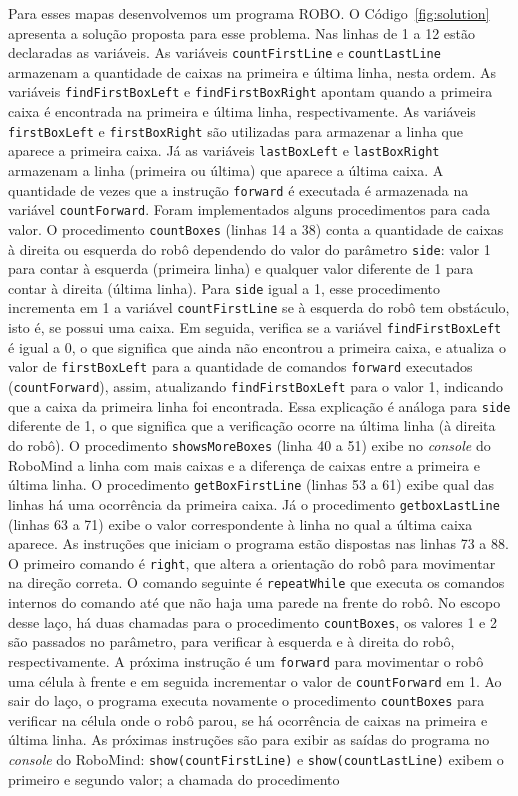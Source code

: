 Para esses mapas desenvolvemos um programa ROBO. O Código~\ref{fig:solution} apresenta a solução proposta para esse problema. Nas linhas de 1 a 12 estão declaradas as variáveis. As variáveis \texttt{countFirstLine} e \texttt{countLastLine} armazenam a quantidade de caixas na primeira e última linha, nesta ordem. As variáveis \texttt{findFirstBoxLeft} e \texttt{findFirstBoxRight} apontam quando a primeira caixa é encontrada na primeira e última linha, respectivamente. As variáveis \texttt{firstBoxLeft} e \texttt{firstBoxRight} são utilizadas para armazenar a linha que aparece a primeira caixa. Já as variáveis \texttt{lastBoxLeft} e \texttt{lastBoxRight} armazenam a linha (primeira ou última) que aparece a última caixa. A quantidade de vezes que a instrução \texttt{forward} é executada é armazenada na variável \texttt{countForward}. Foram implementados alguns procedimentos para cada valor. O procedimento \texttt{countBoxes} (linhas 14 a 38) conta a quantidade de caixas à direita ou esquerda do robô dependendo do valor do parâmetro \texttt{side}: valor 1 para contar à esquerda (primeira linha) e qualquer valor diferente de 1 para contar à direita (última linha). Para \texttt{side} igual a 1, esse procedimento incrementa em 1 a variável \texttt{countFirstLine} se à esquerda do robô tem obstáculo, isto é, se possui uma caixa. Em seguida, verifica se a variável \texttt{findFirstBoxLeft} é igual a 0, o que significa que ainda não encontrou a primeira caixa, e atualiza o valor de \texttt{firstBoxLeft} para a quantidade de comandos \texttt{forward} executados (\texttt{countForward}), assim, atualizando \texttt{findFirstBoxLeft} para o valor 1, indicando que a caixa da primeira linha foi encontrada. Essa explicação é análoga para \texttt{side} diferente de 1, o que significa que a verificação ocorre na última linha (à direita do robô). O procedimento \texttt{showsMoreBoxes} (linha 40 a 51) exibe no \textit{console} do RoboMind a linha com mais caixas e a diferença de caixas entre a primeira e última linha. O procedimento \texttt{getBoxFirstLine} (linhas 53 a 61) exibe qual das linhas há uma ocorrência da primeira caixa. Já o procedimento \texttt{getboxLastLine} (linhas 63 a 71) exibe o valor correspondente à linha no qual a última caixa aparece. As instruções que iniciam o programa estão dispostas nas linhas 73 a 88. O primeiro comando é \texttt{right}, que altera a orientação do robô para movimentar na direção correta. O comando seguinte é \texttt{repeatWhile} que executa os comandos internos do comando até que não haja uma parede na frente do robô. No escopo desse laço, há duas chamadas para o procedimento \texttt{countBoxes}, os valores 1 e 2 são passados no parâmetro, para verificar à esquerda e à direita do robô, respectivamente. A próxima instrução é um \texttt{forward} para movimentar o robô uma célula à frente e em seguida incrementar o valor de \texttt{countForward} em 1. Ao sair do laço, o programa executa novamente o procedimento \texttt{countBoxes} para verificar na célula onde o robô parou, se há ocorrência de caixas na primeira e última linha. As próximas instruções são para exibir as saídas do programa no \textit{console} do RoboMind: \texttt{show(countFirstLine)} e \texttt{show(countLastLine)} exibem o primeiro e segundo valor; a chamada do procedimento 